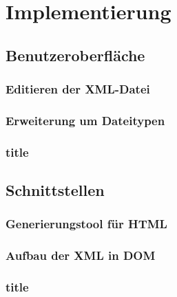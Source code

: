 \section{Implementierung}

\subsection{Benutzeroberfläche}

\subsubsection{Editieren der XML-Datei}
\subsubsection{Erweiterung um Dateitypen}
\subsubsection{title}

\subsection{Schnittstellen}
\subsubsection{Generierungstool für HTML}
\subsubsection{Aufbau der XML in DOM}
\subsubsection{title}